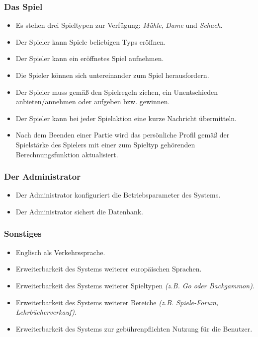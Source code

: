 \subsubsection{Das Spiel}
\begin{itemize}
	\item Es stehen drei Spieltypen zur Verfügung: \textit{Mühle}, \textit{Dame} und \textit{Schach}.
	\item Der Spieler kann Spiele beliebigen Typs eröffnen.
	\item Der Spieler kann ein eröffnetes Spiel aufnehmen.
	\item Die Spieler können sich untereinander zum Spiel herausfordern.
	\item Der Spieler muss gemäß den Spielregeln ziehen, ein Unentschieden anbieten/annehmen oder aufgeben bzw. gewinnen.
	\item Der Spieler kann bei jeder Spielaktion eine kurze Nachricht übermitteln.
	\item Nach dem Beenden einer Partie wird das persönliche Profil gemäß der Spielstärke des Spielers mit einer zum Spieltyp gehörenden Berechnungsfunktion aktualisiert.
\end{itemize}

\subsubsection{Der Administrator}
\begin{itemize}
	\item Der Administrator konfiguriert die Betriebsparameter des Systems.
	\item Der Administrator sichert die Datenbank.
\end{itemize}
\subsubsection{Sonstiges}
\begin{itemize}
	\item Englisch als Verkehrssprache.
	\item Erweiterbarkeit des Systems weiterer europäischen Sprachen.
	\item Erweiterbarkeit des Systems weiterer Spieltypen \textit{(z.B. Go oder Backgammon)}.
	\item Erweiterbarkeit des Systems weiterer Bereiche \textit{(z.B. Spiele-Forum, Lehrbücherverkauf)}.
	\item Erweiterbarkeit des Systems zur gebührenpflichten Nutzung für die Benutzer.
\end{itemize}

